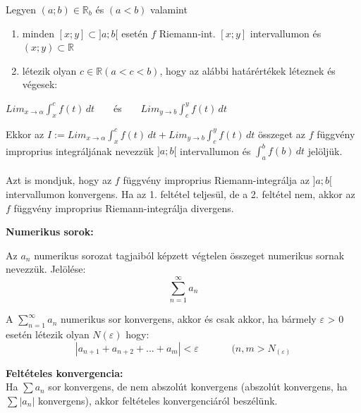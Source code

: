 \documentclass[11pt,a4paper]{article}
\begin{document}
\begin{tcolorbox}[colback=green!5!white,colframe=green!60!black,title= 6. Improprius integrál]
    Legyen \((a; b) \in \mathbb{R}_b \) és \((a < b)\) valamint
    \begin{enumerate}
        \item minden \([x; y] \subset  ]a; b[\) esetén \(f\) Riemann-int. \([x; y]\) intervallumon és \((x; y) \subset \mathbb{R}\)
        \item létezik olyan \(c \in \mathbb{R}  (a < c < b)\), hogy az alábbi határértékek léteznek és végesek:
    \end{enumerate}
    \begin{center}
        \(Lim_{x \to \alpha }\int_{x}^{c} f(t) \,dt\) \(\hspace{15pt}\) és \(\hspace{15pt}\) \(Lim_{y \to b }\int_{c}^{y} f(t) \,dt\)
    \end{center}
    Ekkor az \(I:= Lim_{x \to \alpha }\int_{x}^{c} f(t) \,dt +  Lim_{y \to b }\int_{c}^{y} f(t) \,dt \) összeget az \(f\) függvény improprius integráljának nevezzük \(]a; b[\) intervallumon és \(\int_{a}^{b} f(b) \,dt \) jelöljük.\\\\
    Azt is mondjuk, hogy az \(f\) függvény improprius Riemann-integrálja az \(]a; b[\) intervallumon konvergens.
Ha az 1. feltétel teljesül, de a 2. feltétel nem, akkor az \(f\) függvény improprius Riemann-integrálja
divergens.
\end{tcolorbox}

\newpage
\textbf{Numerikus sorok:}

\begin{tcolorbox}[colback=green!5!white,colframe=green!60!black,title= 1. Numerikus sor fogalma]
    Az \(a_n\) numerikus sorozat tagjaiból képzett végtelen összeget numerikus sornak nevezzük. Jelölése:
    $$\sum_{n = 1}^{\infty} a_n $$
\end{tcolorbox}

\begin{tcolorbox}[colback=green!5!white,colframe=green!60!black,title= 2. Numerikus sor konvergenciája]
A \(\sum_{n = 1}^{\infty} a_n\) numerikus sor konvergens, akkor és csak akkor, ha bármely \(\varepsilon\) > 0 esetén létezik olyan \(N(\varepsilon)\)
hogy:
$$\left\lvert a_{n+1} + a_{n+2} + ... + a_m\right\rvert < \varepsilon \hspace{40pt} (n, m >N_{(\varepsilon)}$$

\textbf{Feltételes konvergencia:}\\
Ha \(\sum a_n\) sor konvergens, de nem abszolút konvergens (abszolút konvergens, ha \(\sum \left\lvert a_n\right\rvert \)  konvergens), akkor feltételes konvergenciáról beszélünk.
\end{tcolorbox}
\end{document}
